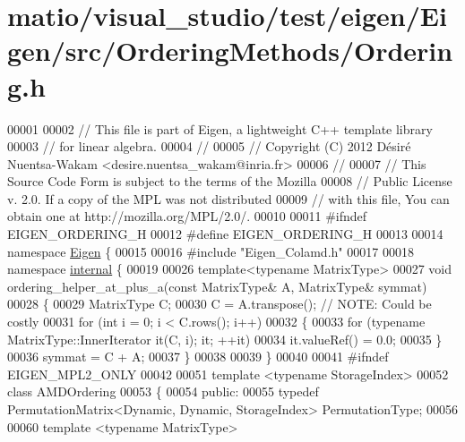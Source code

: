 \hypertarget{matio_2visual__studio_2test_2eigen_2_eigen_2src_2_ordering_methods_2_ordering_8h_source}{}\section{matio/visual\+\_\+studio/test/eigen/\+Eigen/src/\+Ordering\+Methods/\+Ordering.h}
\label{matio_2visual__studio_2test_2eigen_2_eigen_2src_2_ordering_methods_2_ordering_8h_source}

\begin{DoxyCode}
00001  
00002 \textcolor{comment}{// This file is part of Eigen, a lightweight C++ template library}
00003 \textcolor{comment}{// for linear algebra.}
00004 \textcolor{comment}{//}
00005 \textcolor{comment}{// Copyright (C) 2012  Désiré Nuentsa-Wakam <desire.nuentsa\_wakam@inria.fr>}
00006 \textcolor{comment}{//}
00007 \textcolor{comment}{// This Source Code Form is subject to the terms of the Mozilla}
00008 \textcolor{comment}{// Public License v. 2.0. If a copy of the MPL was not distributed}
00009 \textcolor{comment}{// with this file, You can obtain one at http://mozilla.org/MPL/2.0/.}
00010 
00011 \textcolor{preprocessor}{#ifndef EIGEN\_ORDERING\_H}
00012 \textcolor{preprocessor}{#define EIGEN\_ORDERING\_H}
00013 
00014 \textcolor{keyword}{namespace }\hyperlink{namespace_eigen}{Eigen} \{
00015   
00016 \textcolor{preprocessor}{#include "Eigen\_Colamd.h"}
00017 
00018 \textcolor{keyword}{namespace }\hyperlink{namespaceinternal}{internal} \{
00019     
00026 \textcolor{keyword}{template}<\textcolor{keyword}{typename} MatrixType> 
00027 \textcolor{keywordtype}{void} ordering\_helper\_at\_plus\_a(\textcolor{keyword}{const} MatrixType& A, MatrixType& symmat)
00028 \{
00029   MatrixType C;
00030   C = A.transpose(); \textcolor{comment}{// NOTE: Could be  costly}
00031   \textcolor{keywordflow}{for} (\textcolor{keywordtype}{int} i = 0; i < C.rows(); i++) 
00032   \{
00033       \textcolor{keywordflow}{for} (\textcolor{keyword}{typename} MatrixType::InnerIterator it(C, i); it; ++it)
00034         it.valueRef() = 0.0;
00035   \}
00036   symmat = C + A;
00037 \}
00038     
00039 \}
00040 
00041 \textcolor{preprocessor}{#ifndef EIGEN\_MPL2\_ONLY}
00042 
00051 \textcolor{keyword}{template} <\textcolor{keyword}{typename} StorageIndex>
00052 \textcolor{keyword}{class }AMDOrdering
00053 \{
00054   \textcolor{keyword}{public}:
00055     \textcolor{keyword}{typedef} PermutationMatrix<Dynamic, Dynamic, StorageIndex> PermutationType;
00056     
00060     \textcolor{keyword}{template} <\textcolor{keyword}{typename} MatrixType>

\end{DoxyCode}

